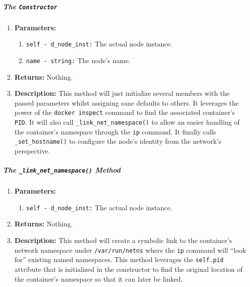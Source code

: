         \subparagraph{The \texttt{Constructor}}
            \begin{enumerate}
                \item \textbf{Parameters:}
                \begin{enumerate}
                    \item \texttt{self - d\_node\_inst:} The actual node instance.
                    \item \texttt{name - string:} The node's name.
                \end{enumerate}
                \item \textbf{Returns:} Nothing.
                \item \textbf{Description:} This method will just initialize several members with the passed parameters whilst assigning sane defaults to others. It leverages the power of the \texttt{docker inspect} command to find the associated container's \texttt{PID}. It will also call \texttt{\_link\_net\_namespace()} to allow an easier handling of the container's namespace through the \texttt{ip} command. It finally calls \texttt{\_set\_hostname()} to configure the node's identity from the network's perspective.
            \end{enumerate}

        \subparagraph{The \texttt{\_link\_net\_namespace()} Method}
            \begin{enumerate}
                \item \textbf{Parameters:}
                \begin{enumerate}
                    \item \texttt{self - d\_node\_inst:} The actual node instance.
                \end{enumerate}
                \item \textbf{Returns:} Nothing.
                \item \textbf{Description:} This method will create a symbolic link to the container's network namespace under \texttt{/var/run/netns} where the \texttt{ip} command will ``look for'' existing named namespaces. This method leverages the \texttt{self.pid} attribute that is initialized in the constructor to find the original location of the container's namespace so that it can later be linked.
            \end{enumerate}

